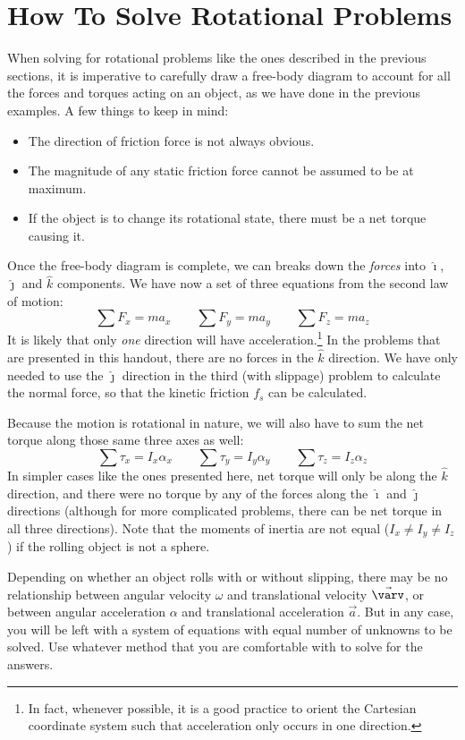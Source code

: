\documentclass{../../oss-handout}
\newcommand{\iii}{\hat\imath}}
\newcommand{\jjj}{\hat\jmath}}
\newcommand{\kkk}{\hat k}}
\begin{document}
\section{How To Solve Rotational Problems}

When solving for rotational problems like the ones described in the previous
sections, it is imperative to carefully draw a free-body diagram to account for
all the forces and torques acting on an object, as we have done in the previous
examples. A few things to keep in mind:
\begin{itemize}[noitemsep,topsep=0pt]
\item The direction of friction force is not always obvious.
\item The magnitude of any static friction force cannot be assumed to be at
  maximum.
\item If the object is to change its rotational state, there must be a net
  torque causing it.
\end{itemize}
Once the free-body diagram is
complete, we can breaks down the \emph{forces} into $\iii$, $\jjj$ and $\kkk$
components. We have now a set of three equations from the second law of motion:
\begin{equation*}
  \sum F_x=ma_x\quad\quad \sum F_y=ma_y\quad\quad \sum F_z=ma_z
\end{equation*}
It is likely that only \emph{one} direction will have acceleration.\footnote{In
  fact, whenever possible, it is a good practice to orient the Cartesian
  coordinate system such that acceleration only occurs in one direction.} In
the problems that are presented in this handout, there are no forces in the
$\kkk$ direction. We have only needed to use the $\jjj$ direction in the third
(with slippage) problem to calculate the normal force, so that the kinetic
friction $f_s$ can be calculated.

Because the motion is rotational in nature, we will also have to sum the net
torque along those same three axes as well:
\begin{equation*}
  \sum\tau_x=I_x\alpha_x\quad\quad \sum\tau_y=I_y\alpha_y\quad\quad 
  \sum\tau_z=I_z\alpha_z
\end{equation*}
In simpler cases like the ones presented here, net torque will only be along
the $\kkk$ direction, and there were no torque by any of the forces along the
$\iii$ and $\jjj$ directions (although for more complicated problems, there can
be net torque in all three directions). Note that the moments of inertia are
not equal ($I_x\neq I_y\neq I_z$) if the rolling object is not a sphere.

Depending on whether an object rolls with or without slipping, there may be
no relationship between angular velocity $\omega$ and translational velocity
$\vec\varv$, or between angular acceleration $\alpha$ and translational
acceleration $\vec a$. But in any case, you will be left with a system of
equations with equal number of unknowns to be solved. Use whatever method that
you are comfortable with to solve for the answers.
\end{document}
